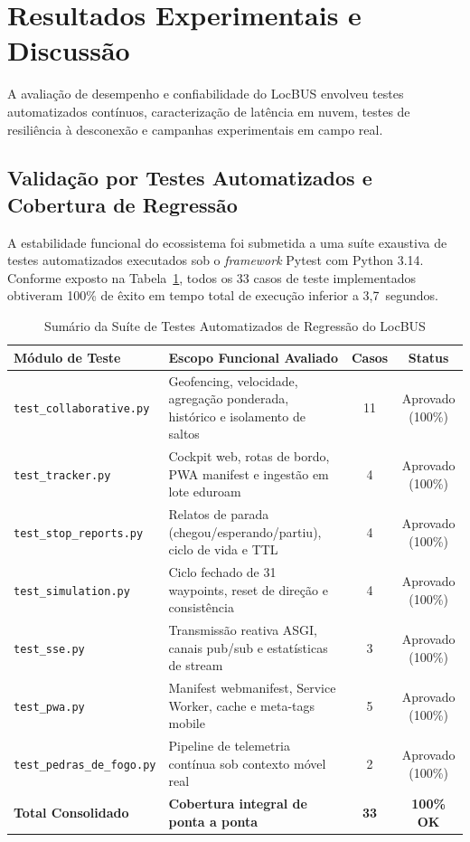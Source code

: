 \documentclass[lettersize,journal]{IEEEtran}
\begin{document}
\section{Resultados Experimentais e Discussão}
A avaliação de desempenho e confiabilidade do LocBUS envolveu testes automatizados contínuos, caracterização de latência em nuvem, testes de resiliência à desconexão e campanhas experimentais em campo real.

\subsection{Validação por Testes Automatizados e Cobertura de Regressão}
A estabilidade funcional do ecossistema foi submetida a uma suíte exaustiva de testes automatizados executados sob o \textit{framework} Pytest com Python 3.14. Conforme exposto na Tabela~\ref{tab_testes}, todos os 33 casos de teste implementados obtiveram 100\% de êxito em tempo total de execução inferior a 3,7~segundos.

\begin{table}[h]
\centering
\caption{Sumário da Suíte de Testes Automatizados de Regressão do LocBUS}
\label{tab_testes}
\begin{tabular}{lp{3.6cm}cc}
\toprule
\textbf{Módulo de Teste} & \textbf{Escopo Funcional Avaliado} & \textbf{Casos} & \textbf{Status} \\
\midrule
\texttt{test\_collaborative.py} & Geofencing, velocidade, agregação ponderada, histórico e isolamento de saltos & 11 & Aprovado (100\%) \\
\texttt{test\_tracker.py} & Cockpit web, rotas de bordo, PWA manifest e ingestão em lote eduroam & 4 & Aprovado (100\%) \\
\texttt{test\_stop\_reports.py} & Relatos de parada (chegou/esperando/partiu), ciclo de vida e TTL & 4 & Aprovado (100\%) \\
\texttt{test\_simulation.py} & Ciclo fechado de 31 waypoints, reset de direção e consistência & 4 & Aprovado (100\%) \\
\texttt{test\_sse.py} & Transmissão reativa ASGI, canais pub/sub e estatísticas de stream & 3 & Aprovado (100\%) \\
\texttt{test\_pwa.py} & Manifest webmanifest, Service Worker, cache e meta-tags mobile & 5 & Aprovado (100\%) \\
\texttt{test\_pedras\_de\_fogo.py} & Pipeline de telemetria contínua sob contexto móvel real & 2 & Aprovado (100\%) \\
\midrule
\textbf{Total Consolidado} & \textbf{Cobertura integral de ponta a ponta} & \textbf{33} & \textbf{100\% OK} \\
\bottomrule
\end{tabular}
\end{table}
\end{document}
